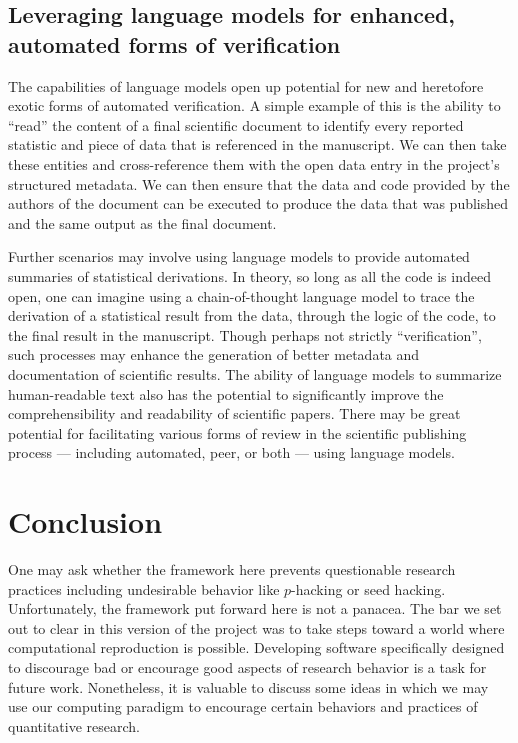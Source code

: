 \hypertarget{leveraging-language-models-for-enhanced-automated-forms-of-verification}{%
\subsection{Leveraging language models for enhanced, automated forms of verification}\label{leveraging-language-models-for-enhanced-automated-forms-of-verification}}

The capabilities of language models open up potential for new and heretofore exotic forms of automated verification. 
A simple example of this is the ability to ``read'' the content of a final scientific document to identify every reported statistic and piece of data that is referenced in the manuscript. We can then take these entities and cross-reference them with the open data entry in the project's structured metadata. We can then ensure that the data and code provided by the authors of the document can be executed to produce the data that was published and the same output as the final document.

Further scenarios may involve using language models to provide automated summaries of statistical derivations. In theory, so long as all the code is indeed open, one can imagine using a chain-of-thought language model to trace the derivation of a statistical result from the data, through the logic of the code, to the final result in the manuscript. Though perhaps not strictly ``verification'', such processes may enhance the generation of better metadata and documentation of scientific results. The ability of language models to summarize human-readable text also has the potential to significantly improve the comprehensibility and readability of scientific papers. There may be great potential for facilitating various forms of review in the scientific publishing process --- including automated, peer, or both --- using language models.

\hypertarget{conclusion}{%
\section{Conclusion}\label{conclusion}}

One may ask whether the framework here prevents questionable research practices including undesirable behavior like $p$-hacking or seed hacking. Unfortunately, the framework put forward here is not a panacea. The bar we set out to clear in this version of the project was to take steps toward a world where computational reproduction is possible. Developing software specifically designed to discourage bad or encourage good aspects of research behavior is a task for future work. Nonetheless, it is valuable to discuss some ideas in which we may use our computing paradigm to encourage certain behaviors and practices of quantitative research.

